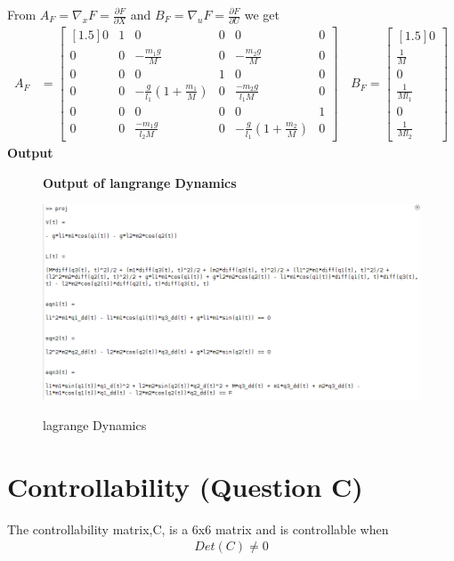 \documentclass[12pt]{article}
\begin{document}
From $A_F = \nabla_xF=\frac{\partial F}{\partial X}$ and $B_F=\nabla_uF=\frac{\partial F}{\partial U}$ we get 
\begin{align}
  A_F&=
  \begin{bmatrix}[1.5]
   0 &1 &0 &0 &0 &0 \\
   0 &0 &-\frac{m_1g}{M} &0 &-\frac{m_2g}{M} &0 \\
   0 &0 &0 &1 &0 &0 \\
   0 &0 &-\frac{g}{l_1}(1+\frac{m_1}{M}) &0 &\frac{-m_2g}{l_1M} &0  \\
   0 &0 &0 &0 &0 &1 \\
   0 &0 &\frac{-m_1g}{l_2M} &0 &-\frac{g}{l_1}(1+\frac{m_2}{M}) &0 
  \end{bmatrix}
 \quad
  B_F =
  \begin{bmatrix}[1.5]
    0\\
    \frac{1}{M} \\
    0 \\
    \frac{1}{Ml_1}\\
    0 \\
    \frac{1}{Ml_2}
  \end{bmatrix}
\end{align}
\textbf{Output}
\begin{figure}[H]
    \centering
    \textbf{Output of langrange Dynamics}\par\medskip
    \includegraphics[scale = 0.5]{lagrange.png}\\[0.0 cm]	%
    \caption{lagrange Dynamics} 
\end{figure}

\section{Controllability (Question C)}
The controllability matrix,C, is a 6x6 matrix and is controllable when
\begin{align}
  Det(C) \neq 0
\end{align}
\end{document}
